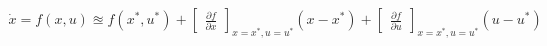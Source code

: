 \documentclass[preview]{standalone}
\begin{document}
\begin{align*}
\dot{x} = {f}(x,u) \approxeq {f}(x^*,u^*) + \begin{bmatrix} \frac{\partial f}{\partial x}\end{bmatrix}_{x=x^*,u=u^*} (x - x^*) + \begin{bmatrix} \frac {\partial f}{\partial u}\end{bmatrix}_{x=x^*,u=u^*} (u - u^*)
\end{align*}
\end{document}
